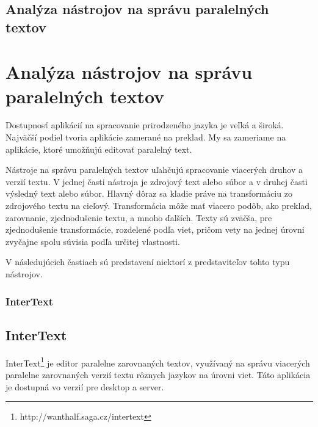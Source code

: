 \newpage
%
%
{
	\section{Analýza nástrojov na správu paralelných textov} 
}
{
	\chapter{Analýza nástrojov na správu paralelných textov}
}
Dostupnosť aplikácií na spracovanie prirodzeného jazyka je veľká a široká. Najväčší podiel tvoria aplikácie zamerané na preklad. My sa zameriame na aplikácie, ktoré umožňujú editovať paralelný text.

Nástroje na správu paralelných textov uľahčujú spracovanie viacerých druhov a verzií textu. V jednej časti nástroja je zdrojový text alebo súbor a v druhej časti výsledný text alebo súbor. Hlavný dôraz sa kladie práve na transformáciu zo zdrojového textu na cieľový. Transformácia môže mať viacero podôb, ako preklad, zarovnanie, zjednodušenie textu, a mnoho ďalších. Texty sú zväčša, pre zjednodušenie transformácie, rozdelené podľa viet, pričom vety na jednej úrovni zvyčajne spolu súvisia podľa určitej vlastnosti.

V následujúcich častiach sú predstavení niektorí z predstaviteľov tohto typu nástrojov.

%
%
{
	\subsection{InterText}
}
{
	\section{InterText}
}
InterText\footnote{http://wanthalf.saga.cz/intertext} je editor paralelne zarovnaných textov, využívaný na správu viacerých paralelne zarovnaných verzií textu rôznych jazykov na úrovni viet. Táto aplikácia je dostupná vo verzií pre desktop a server.

